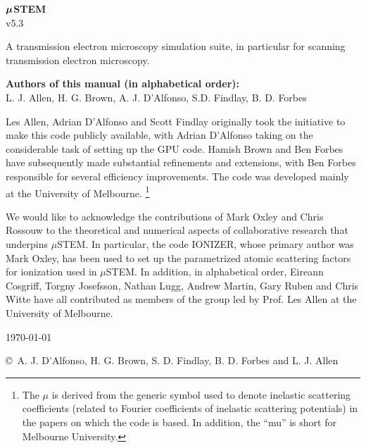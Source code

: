 \documentclass[12pt,a4paper]{article}
\newcommand{\bbox}[1]{{\mbox{\boldmath{$#1$}}}}
\newcommand{\version}{v5.3\ }
\begin{document}


\begin{center}

\vspace*{5mm}

{\Huge{\bf $\bbox{\mu}$STEM}\\ \version}\\ 

\vspace{15mm} 

{\Large A transmission electron microscopy simulation suite, in particular for scanning transmission electron microscopy.}\\

\vspace{10mm}

{\bf Authors of this manual (in alphabetical order):}\\
L. J. Allen,  H. G. Brown, A. J. D'Alfonso, S.D. Findlay, B. D. Forbes 

\end{center}


Les Allen, Adrian D'Alfonso and Scott Findlay  originally took the initiative to make this code publicly available, with Adrian D'Alfonso taking on the considerable task of setting up the GPU code. Hamish Brown and Ben Forbes have subsequently made substantial refinements and extensions, with Ben Forbes responsible for several efficiency improvements. The code was developed mainly at the University of Melbourne. \footnote{ The $\mu$ is derived from the generic symbol used to denote inelastic scattering coefficients (related to Fourier coefficients of inelastic scattering potentials) in the papers on which the code is based. In addition, the ``mu'' is short for Melbourne University.}

We would like to acknowledge the contributions of Mark Oxley and Chris Rossouw to the theoretical and numerical aspects of collaborative research that underpins $\mu$STEM.
In particular, the code IONIZER, whose primary author was Mark Oxley, has been used to set up the parametrized atomic scattering factors for ionization used in $\mu$STEM. 
In addition, in alphabetical order, Eireann Cosgriff, Torgny Josefsson, Nathan Lugg, Andrew Martin, Gary Ruben and Chris Witte have all contributed as members of the group led by Prof. Les Allen at the University of Melbourne. 
\begin{center}
\vspace{10mm}

{\today}

\vspace*{5 mm}

{\small \copyright $\,$  A. J. D'Alfonso, H. G. Brown, S. D. Findlay, B. D. Forbes and L. J. Allen}


\end{center}
\end{document}
